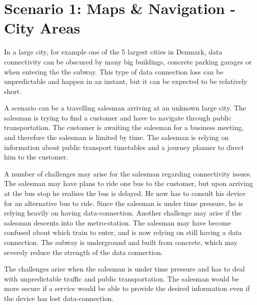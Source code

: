 \section{Scenario 1: Maps \& Navigation - City Areas}
In a large city, for example one of the 5 largest cities in Denmark, data connectivity can be obscured by many big buildings, concrete parking garages or when entering the the subway. This type of data connection loss can be unpredictable and happen in an instant, but it can be expected to be relatively short. 

A scenario can be a travelling salesman arriving at an unknown large city. The salesman is trying to find a customer and have to navigate through public transportation. The customer is awaiting the salesman for a business meeting, and therefore the salesman is limited by time. The salesman is relying on information about public transport timetables and a journey planner to direct him to the customer. 

A number of challenges may arise for the salesman regarding connectivity issues. The salesman may have plans to ride one bus to the customer, but upon arriving at the bus stop he realises the bus is delayed. He now has to consult his device for an alternative bus to ride. Since the salesman is under time pressure, he is relying heavily on having data-connection. Another challenge may arise if the salesman descents into the metro-station. The salesman may have become confused about which train to enter, and is now relying on still having a data connection. The subway is underground and built from concrete, which may severely reduce the strength of the data connection. 

The challenges arise when the salesman is under time pressure and has to deal with unpredictable traffic and public transportation. The salesman would be more secure if a service would be able to provide the desired information even if the device has lost data-connection.